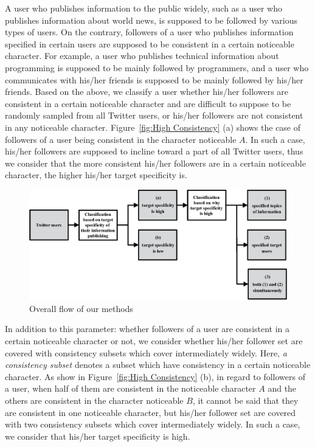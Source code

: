 A user who publishes information to the public widely, such as a user
who publishes information about world news, is supposed to be followed
by various types of users.  On the contrary, followers of a user who
publishes information specified in certain users are supposed to be
consistent in a certain noticeable character.  For example, a user who
publishes technical information about programming is supposed to be
mainly followed by programmers, and a user who communicates with his/her
friends is supposed to be mainly followed by his/her friends.  Based on
the above, we classify a user whether his/her followers are consistent
in a certain noticeable character and are difficult to suppose to be
randomly sampled from all Twitter users, or his/her followers are not
consistent in any noticeable character.  Figure~\ref{fig:High
Consistency} (a) shows the case of followers of a user being consistent
in the character noticeable $A$.  In such a case, his/her followers are
supposed to incline toward a part of all Twitter users, thus we consider
that the more consistent his/her followers are in a certain noticeable
character, the higher his/her target specificity is.

{\footnotesize
\begin{figure}[t]
\begin{center}
\includegraphics[width=14cm]{images/flow.eps}
 \caption{Overall flow of our methods}
\label{fig:Flow}
\end{center}
\end{figure}
}

In addition to this parameter: whether followers of a user are
consistent in a certain noticeable character or not, we consider
whether his/her follower set are covered with consistency subsets which
cover intermediately widely.  Here, \emph{a consistency subset} denotes
a subset which have consistency in a certain noticeable character.  As
show in Figure~\ref{fig:High Consistency} (b), in regard to followers of
a user, when half of them are consistent in the noticeable character $A$
and the others are consistent in the character noticeable $B$, it cannot
be said that they are consistent in one noticeable character, but
his/her follower set are covered with two consistency subsets which
cover intermediately widely.  In such a case, we consider that his/her
target specificity is high.

